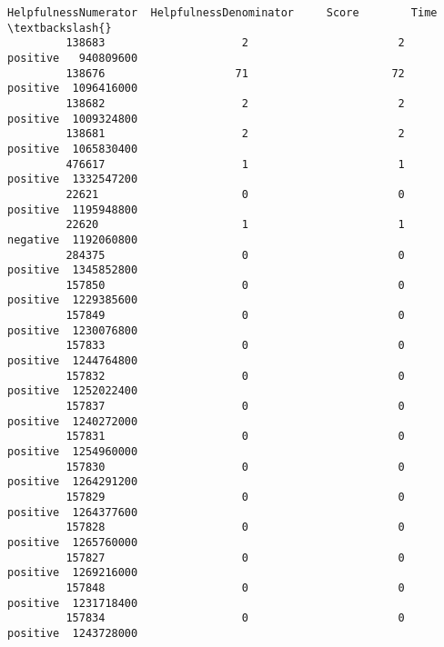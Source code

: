 \documentclass[11pt]{article}
\begin{document}
\begin{Verbatim}[commandchars=\\\{\}]
                 HelpfulnessNumerator  HelpfulnessDenominator     Score        Time  \textbackslash{}
         138683                     2                       2  positive   940809600   
         138676                    71                      72  positive  1096416000   
         138682                     2                       2  positive  1009324800   
         138681                     2                       2  positive  1065830400   
         476617                     1                       1  positive  1332547200   
         22621                      0                       0  positive  1195948800   
         22620                      1                       1  negative  1192060800   
         284375                     0                       0  positive  1345852800   
         157850                     0                       0  positive  1229385600   
         157849                     0                       0  positive  1230076800   
         157833                     0                       0  positive  1244764800   
         157832                     0                       0  positive  1252022400   
         157837                     0                       0  positive  1240272000   
         157831                     0                       0  positive  1254960000   
         157830                     0                       0  positive  1264291200   
         157829                     0                       0  positive  1264377600   
         157828                     0                       0  positive  1265760000   
         157827                     0                       0  positive  1269216000   
         157848                     0                       0  positive  1231718400   
         157834                     0                       0  positive  1243728000   
         

\end{Verbatim}
\end{document}
